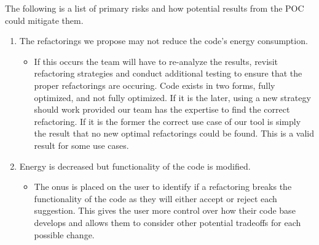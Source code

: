 \documentclass{article}
\begin{document}
\noindent
The following is a list of primary risks and how potential results
from the POC could mitigate them.
\begin{enumerate}

  \item The refactorings we propose may not reduce the code's energy
    consumption.
    \begin{itemize}
      \item If this occurs the team will have to re-analyze the
        results, revisit refactoring strategies and conduct
        additional testing to ensure that the proper refactorings are
        occuring. Code exists in two forms, fully optimized, and not
        fully optimized. If it is the later, using a new strategy
        should work provided our team has the expertise to find the
        correct refactoring. If it is the former the correct use case
        of our tool is simply the result that no new optimal
        refactorings could be found. This is a valid result for some use cases.
    \end{itemize}

  \item Energy is decreased but functionality of the code is modified. 
  \begin{itemize}
    \item The onus is placed on the user to identify if a refactoring breaks the functionality of the code as they will either accept or reject each suggestion. This gives the user more control over how their code base develops and allows them to consider other potential tradeoffs for each possible change.
  \end{itemize} 

\end{enumerate}
\end{document}
